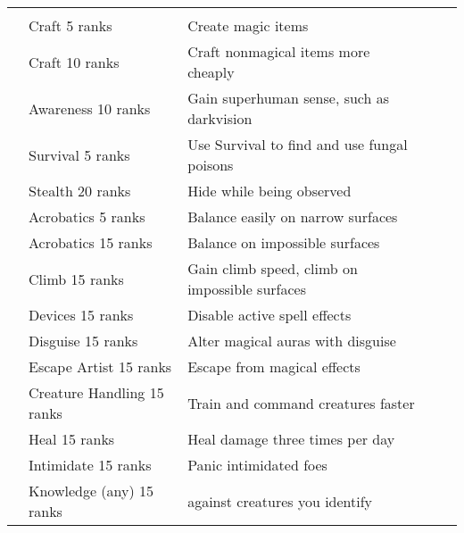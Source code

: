 \begin{longtabuwrapper}
\begin{longtabu}{>{\lcol}p{10em} >{\lcol}p{15em} >{\lcol}X >{\lcol}p{8em} >{\lcol}p{3em}}
        \midrule
         &  &  &  &  \\
         & Craft 5 ranks & Create magic items & \x &  \\
         & Craft 10 ranks & Craft nonmagical items more cheaply & \x &  \\
         & Awareness 10 ranks & Gain superhuman sense, such as darkvision & \x &  \\
         & Survival 5 ranks & Use Survival to find and use fungal poisons & \x &  \\
         & Stealth 20 ranks & Hide while being observed & \x &  \\
         & Acrobatics 5 ranks & Balance easily on narrow surfaces & \x &  \\
         & Acrobatics 15 ranks & Balance on impossible surfaces & \x &  \\
         & Climb 15 ranks & Gain climb speed, climb on impossible surfaces & \x &  \\
         & Devices 15 ranks & Disable active spell effects & \x &  \\
         & Disguise 15 ranks & Alter magical auras with disguise & \x &  \\
         & Escape Artist 15 ranks & Escape from magical effects & \x &  \\
         & Creature Handling 15 ranks & Train and command creatures faster & \x &  \\
         & Heal 15 ranks & Heal damage three times per day & \x &  \\
         & Intimidate 15 ranks & Panic intimidated foes & \x &  \\
         & Knowledge (any) 15 ranks &  against creatures you identify & \x &  \\

\end{longtabu}
\end{longtabuwrapper}
